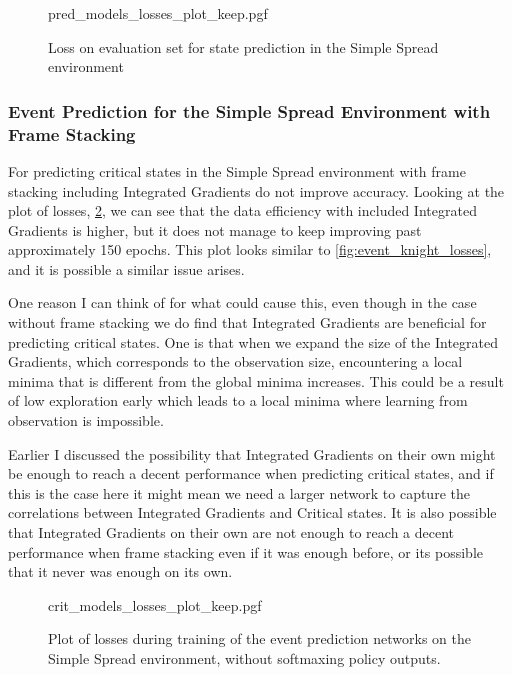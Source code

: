 \documentclass[UKenglish]{uiomasterthesis}
\begin{document}
\begin{figure}[H]
    \centering
    {pred_models_losses_plot_keep.pgf}
    \caption{Loss on evaluation set for state prediction in the Simple Spread environment}
	\label{fig:pred_losses_stack}
\end{figure}

\subsubsection{Event Prediction for the Simple Spread Environment with Frame Stacking}

For predicting critical states in the Simple Spread environment with frame stacking including Integrated Gradients do not improve accuracy. Looking at the plot of losses, \cref{fig:crit_losses_stack}, we can see that the data efficiency with included Integrated Gradients is higher, but it does not manage to keep improving past approximately 150 epochs. This plot looks similar to \cref{fig:event_knight_losses}, and it is possible a similar issue arises.

One reason I can think of for what could cause this, even though in the case without frame stacking we do find that Integrated Gradients are beneficial for predicting critical states. One is that when we expand the size of the Integrated Gradients, which corresponds to the observation size, encountering a local minima that is different from the global minima increases. This could be a result of low exploration early which leads to a local minima where learning from observation is impossible.

Earlier I discussed the possibility that Integrated Gradients on their own might be enough to reach a decent performance when predicting critical states, and if this is the case here it might mean we need a larger network to capture the correlations between Integrated Gradients and Critical states. It is also possible that Integrated Gradients on their own are not enough to reach a decent performance when frame stacking even if it was enough before, or its possible that it never was enough on its own. 

\begin{figure}[H]
    \centering
    {crit_models_losses_plot_keep.pgf}
    \caption{Plot of losses during training of the event prediction networks on the Simple Spread environment, without softmaxing policy outputs.}
	\label{fig:crit_losses_stack}
\end{figure}
\end{document}
